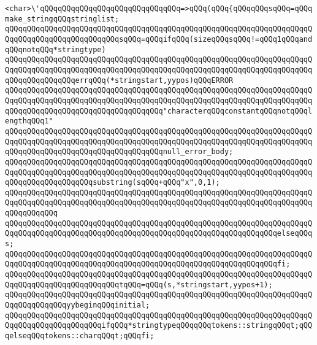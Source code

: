 \newline
\newline
\verb|<char>\'qQQqqQQqqQQqqQQqqQQqqQQqqQQqqQQq=>qQQq(qQQq{qQQqqQQqsqQQq=qQQqmake_stringqQQqstringlist;|\newline
\verb|qQQqqQQqqQQqqQQqqQQqqQQqqQQqqQQqqQQqqQQqqQQqqQQqqQQqqQQqqQQqqQQqqQQqqQQqqQQqqQQqqQQqqQQqqQQqqQQqsqQQq=qQQqifqQQq(sizeqQQqsqQQq!=qQQq1qQQqandqQQqnotqQQq*stringtype)|\newline
\verb|qQQqqQQqqQQqqQQqqQQqqQQqqQQqqQQqqQQqqQQqqQQqqQQqqQQqqQQqqQQqqQQqqQQqqQQqqQQqqQQqqQQqqQQqqQQqqQQqqQQqqQQqqQQqqQQqqQQqqQQqqQQqqQQqqQQqqQQqqQQqqQQqqQQqqQQqqQQqerrqQQq(*stringstart,yypos)qQQqERROR|\newline
\verb|qQQqqQQqqQQqqQQqqQQqqQQqqQQqqQQqqQQqqQQqqQQqqQQqqQQqqQQqqQQqqQQqqQQqqQQqqQQqqQQqqQQqqQQqqQQqqQQqqQQqqQQqqQQqqQQqqQQqqQQqqQQqqQQqqQQqqQQqqQQqqQQqqQQqqQQqqQQqqQQqqQQqqQQqqQQqqQQq"characterqQQqconstantqQQqnotqQQqlengthqQQq1"|\newline
\verb|qQQqqQQqqQQqqQQqqQQqqQQqqQQqqQQqqQQqqQQqqQQqqQQqqQQqqQQqqQQqqQQqqQQqqQQqqQQqqQQqqQQqqQQqqQQqqQQqqQQqqQQqqQQqqQQqqQQqqQQqqQQqqQQqqQQqqQQqqQQqqQQqqQQqqQQqqQQqqQQqqQQqqQQqqQQqqQQqnull_error_body;|\newline
\verb|qQQqqQQqqQQqqQQqqQQqqQQqqQQqqQQqqQQqqQQqqQQqqQQqqQQqqQQqqQQqqQQqqQQqqQQqqQQqqQQqqQQqqQQqqQQqqQQqqQQqqQQqqQQqqQQqqQQqqQQqqQQqqQQqqQQqqQQqqQQqqQQqqQQqqQQqqQQqqQQqsubstring(sqQQq+qQQq"x",0,1);|\newline
\verb|qQQqqQQqqQQqqQQqqQQqqQQqqQQqqQQqqQQqqQQqqQQqqQQqqQQqqQQqqQQqqQQqqQQqqQQqqQQqqQQqqQQqqQQqqQQqqQQqqQQqqQQqqQQqqQQqqQQqqQQqqQQqqQQqqQQqqQQqqQQqqQQqqQQqqQQq|\newline
\verb|qQQqqQQqqQQqqQQqqQQqqQQqqQQqqQQqqQQqqQQqqQQqqQQqqQQqqQQqqQQqqQQqqQQqqQQqqQQqqQQqqQQqqQQqqQQqqQQqqQQqqQQqqQQqqQQqqQQqqQQqqQQqqQQqqQQqelseqQQqs;|\newline
\verb|qQQqqQQqqQQqqQQqqQQqqQQqqQQqqQQqqQQqqQQqqQQqqQQqqQQqqQQqqQQqqQQqqQQqqQQqqQQqqQQqqQQqqQQqqQQqqQQqqQQqqQQqqQQqqQQqqQQqqQQqqQQqqQQqqQQqfi;|\newline
\verb|qQQqqQQqqQQqqQQqqQQqqQQqqQQqqQQqqQQqqQQqqQQqqQQqqQQqqQQqqQQqqQQqqQQqqQQqqQQqqQQqqQQqqQQqqQQqqQQqtqQQq=qQQq(s,*stringstart,yypos+1);|\newline
\verb|qQQqqQQqqQQqqQQqqQQqqQQqqQQqqQQqqQQqqQQqqQQqqQQqqQQqqQQqqQQqqQQqqQQqqQQqqQQqqQQqqQQqyybeginqQQqinitial;|\newline
\verb|qQQqqQQqqQQqqQQqqQQqqQQqqQQqqQQqqQQqqQQqqQQqqQQqqQQqqQQqqQQqqQQqqQQqqQQqqQQqqQQqqQQqqQQqqQQqifqQQq*stringtypeqQQqqQQqtokens::stringqQQqt;qQQqelseqQQqtokens::charqQQqt;qQQqfi;|\newline
